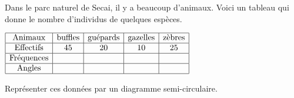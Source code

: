 \begin{exercice*}
    Dans le parc naturel de Secai, il y a beaucoup d'animaux.
    Voici un tableau qui donne le nombre d'individus de quelques espèces.
    
    \smallskip
    $\begin{array}{|c|c|c|c|c|}
    \hline
    \text{Animaux} & \text{buffles} & \text{guépards} & \text{gazelles} & \text{zèbres}\\
    \hline
    \text{Effectifs} & 45 & 20 & 10 & 25\\
    \hline
    \text{Fréquences} &   &   &   &  \\
    \hline
    \text{Angles} &   &   &   &  \\
    \hline
    \end{array}$    
    
    \smallskip
    Représenter ces données par un diagramme semi-circulaire. 

\end{exercice*}
